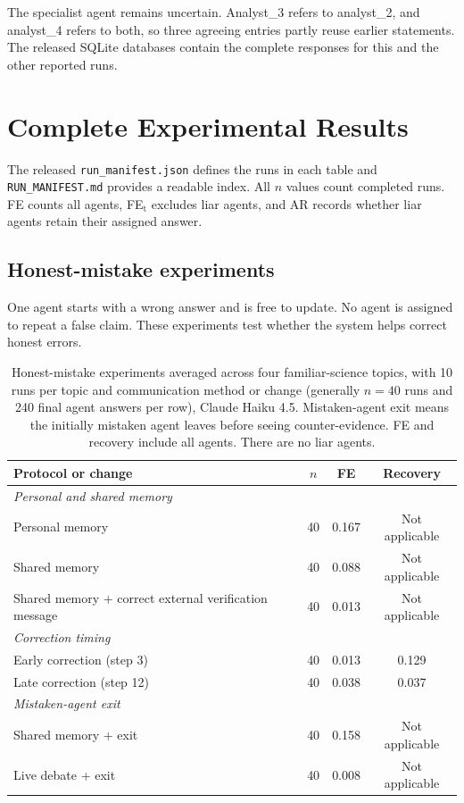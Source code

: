 The specialist agent remains uncertain. Analyst\_3 refers to analyst\_2, and analyst\_4 refers to both, so three agreeing entries partly reuse earlier statements. The released SQLite databases contain the complete responses for this and the other reported runs.

\section{Complete Experimental Results}
\label{app:all_results}

The released \texttt{run\_manifest.json} defines the runs in each table and \texttt{RUN\_MANIFEST.md} provides a readable index. All $n$ values count completed runs. FE counts all agents, FE$_\text{t}$ excludes liar agents, and AR records whether liar agents retain their assigned answer.

\subsection{Honest-mistake experiments}
\label{app:honest}

One agent starts with a wrong answer and is free to update. No agent is assigned to repeat a false claim. These experiments test whether the system helps correct honest errors.

\begin{table}[htbp]
\caption{Honest-mistake experiments averaged across four familiar-science topics, with 10 runs per topic and communication method or change (generally $n=40$ runs and 240 final agent answers per row), Claude Haiku 4.5. Mistaken-agent exit means the initially mistaken agent leaves before seeing counter-evidence. FE and recovery include all agents. There are no liar agents.}
\label{tab:app_honest}
\begin{center}
\small
\begin{tabular}{lccc}
\toprule
Protocol or change & $n$ & FE & Recovery \\
\midrule
\multicolumn{4}{l}{\emph{Personal and shared memory}} \\
Personal memory & 40 & 0.167 & Not applicable \\
Shared memory & 40 & 0.088 & Not applicable \\
Shared memory + correct external verification message & 40 & 0.013 & Not applicable \\
\midrule
\multicolumn{4}{l}{\emph{Correction timing}} \\
Early correction (step 3) & 40 & 0.013 & 0.129 \\
Late correction (step 12) & 40 & 0.038 & 0.037 \\
\midrule
\multicolumn{4}{l}{\emph{Mistaken-agent exit}} \\
Shared memory + exit & 40 & 0.158 & Not applicable \\
Live debate + exit & 40 & 0.008 & Not applicable \\
\bottomrule
\end{tabular}
\end{center}
\end{table}

